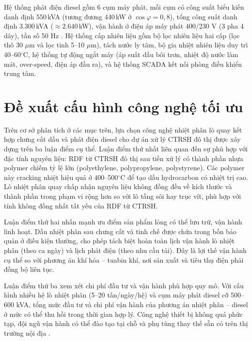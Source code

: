 \documentclass[../main.tex]{subfiles}
\begin{document}
Hệ thống phát điện diesel gồm 6 cụm máy phát, mỗi cụm có công suất biểu kiến danh định 550\,kVA (tương đương 440\,kW ở $\cos\varphi = 0{,}8$), tổng công suất danh định 3.300\,kVA ($\approx 2.640$\,kW), vận hành ở điện áp máy phát 400/230 V (3 pha 4 dây), tần số 50 Hz \cite{EPA2015CHP}. Hệ thống cấp nhiên liệu gồm bộ lọc nhiên liệu hai cấp (lọc thô 30 $\mu$m và lọc tinh 5--10 $\mu$m), tách nước ly tâm, bộ gia nhiệt nhiên liệu duy trì 40--60$^\circ\mathrm{C}$, hệ thống tự động ngắt máy (áp suất dầu bôi trơn, nhiệt độ nước làm mát, over-speed, điện áp đầu ra), và hệ thống SCADA kết nối phòng điều khiển trung tâm.


\section{Đề xuất cấu hình công nghệ tối ưu}
\label{sec:tong-hop-cong-nghe}

Trên cơ sở phân tích ở các mục trên, lựa chọn công nghệ nhiệt phân lò quay kết hợp chưng cất dầu và phát điện diesel cho dự án xử lý CTRSH đô thị được xây dựng trên ba luận điểm cụ thể. Luận điểm thứ nhất liên quan đến sự phù hợp với đặc tính nguyên liệu: RDF từ CTRSH đô thị sau tiền xử lý có thành phần nhựa polymer chiếm tỷ lệ lớn (polyethylene, polypropylene, polystyrene). Các polymer này cracking nhiệt hiệu quả ở 400--500$^\circ\mathrm{C}$ để tạo dầu hydrocarbon có nhiệt trị cao. Lò nhiệt phân quay chấp nhận nguyên liệu không đồng đều về kích thước và thành phần trong phạm vi rộng hơn so với lò tầng sôi hay trục vít, phù hợp với tính không đồng nhất tất yếu của RDF từ CTRSH.

Luận điểm thứ hai nhấn mạnh ưu điểm sản phẩm lỏng có thể lưu trữ, vận hành linh hoạt. Dầu nhiệt phân sau chưng cất và tinh chế được chứa trong bồn bảo quản ở điều kiện thường, cho phép tách biệt hoàn toàn lịch vận hành lò nhiệt phân (theo ca ngày) và lịch phát điện (theo nhu cầu tải). Đây là lợi thế vận hành cụ thể so với phương án khí hóa -- tuabin khí, nơi sản xuất và tiêu thụ điện phải đồng bộ liên tục.

Luận điểm thứ ba xem xét chi phí đầu tư và vận hành phù hợp quy mô. Với cấu hình nhiều hệ lò nhiệt phân (5--20 tấn/ngày/hệ) và cụm máy phát diesel cỡ 500--600 kVA, tổng mức đầu tư và chi phí vận hành của phương án nhiệt phân -- diesel ở mức có thể thu hồi trong thời gian hợp lý. Công nghệ thiết bị không quá phức tạp, đội ngũ vận hành có thể đào tạo tại chỗ và phụ tùng thay thế sẵn có trên thị trường nội địa \cite{EPA2015CHP,Arena2012}.
\end{document}
